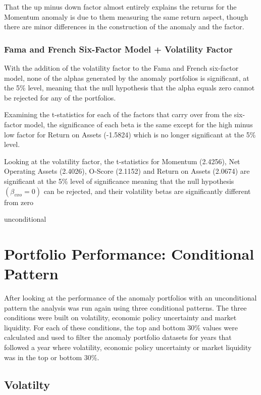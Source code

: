 \documentclass[12pt, a4paper, oneside]{article}
\begin{document}
That the up minus down factor almost entirely explains the returns for the Momentum anomaly is due to them measuring the same return aspect, though there are minor differences in the construction of the anomaly and the factor.

\subsubsection{Fama and French Six-Factor Model + Volatility Factor}
With the addition of the volatility factor to the Fama and French six-factor model, none of the alphas generated by the anomaly portfolios is significant, at the 5\% level, meaning that the null hypothesis that the alpha equals zero cannot be rejected for any of the portfolios. 

Examining the t-statistics for each of the factors that carry over from the six-factor model, the significance of each beta is the same except for the high minus low factor for Return on Assets (-1.5824) which is no longer significant at the 5\% level. 

Looking at the volatility factor, the t-statistics for Momentum (2.4256), Net Operating Assets (2.4026), O-Score (2.1152) and Return on Assets (2.0674) are significant at the 5\% level of significance meaning that the null hypothesis $(\beta_{vxo}= 0)$ can be rejected, and their volatility betas are significantly different from zero

{unconditional}

\section{Portfolio Performance: Conditional Pattern}\label{sec:conditional}
After looking at the performance of the anomaly portfolios with an unconditional pattern the analysis was run again using three conditional patterns. The three conditions were built on volatility, economic policy uncertainty and market liquidity. For each of these conditions, the top and bottom 30\% values were calculated and used to filter the anomaly portfolio datasets for years that followed a year where volatility, economic policy uncertainty or market liquidity was in the top or bottom 30\%.

\subsection{Volatilty}
\end{document}
